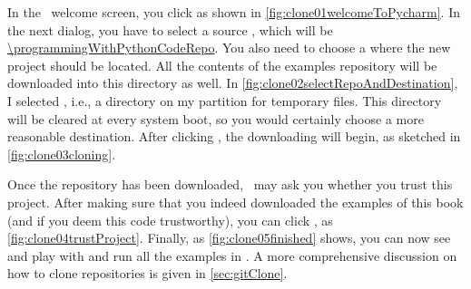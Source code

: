 \begin{sloppypar}%
In the \pycharm\ welcome screen, you click  as shown in \cref{fig:clone01welcomeToPycharm}.
In the next dialog, you have to select a source , which will be \expandafter\url{\programmingWithPythonCodeRepo}.
You also need to choose a  where the new project should be located.
All the contents of the examples repository will be downloaded into this directory as well.
In \cref{fig:clone02selectRepoAndDestination}, I selected , i.e., a directory on my partition for temporary files.
This directory will be cleared at every system boot, so you would certainly choose a more reasonable destination.
After clicking , the downloading will begin, as sketched in \cref{fig:clone03cloning}.%
\end{sloppypar}%
%
Once the repository has been downloaded, \pycharm\ may ask you whether you trust this project.
After making sure that you indeed downloaded the examples of this book (and if you deem this code trustworthy), you can click , as \cref{fig:clone04trustProject}.
Finally, as \cref{fig:clone05finished} shows, you can now see and play with and run all the examples in \pycharm.
A more comprehensive discussion on how to clone repositories is given in \cref{sec:gitClone}.%
%
\FloatBarrier%
\endhsection%
%
